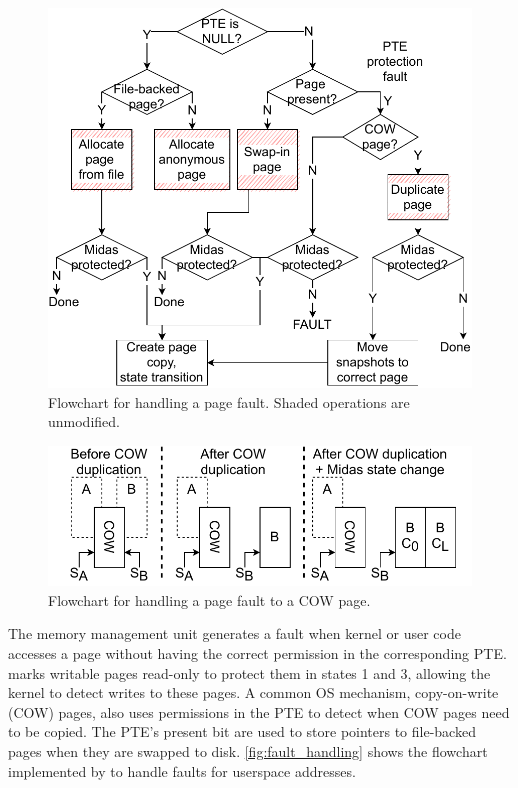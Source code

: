 \begin{figure}[]
  \centering
  \includegraphics[width=\linewidth]{media/midas/pagefault.pdf}
  \caption{Flowchart for handling a page fault. Shaded
          operations are unmodified.}
  \label{fig:fault_handling}
\end{figure}

\begin{figure}[]
  \centering
  \includegraphics[width=\linewidth]{media/midas/pagefault_cow.pdf}
  \caption{Flowchart for handling a page fault to a COW page.}
  \label{fig:fault_handling_cow}
\end{figure}

The memory management unit generates a fault when kernel or user code accesses
a page without having the correct permission in the corresponding PTE.
\midas marks writable pages read-only to protect them in
states 1 and 3, allowing the kernel to detect writes to these pages.
A common OS mechanism, copy-on-write (COW) pages, also uses
permissions in the PTE to detect when COW pages need to be copied.
The PTE's present bit are used to store pointers to file-backed pages
when they are swapped to disk.
\autoref{fig:fault_handling} shows the flowchart implemented by
 to handle faults for userspace addresses.

